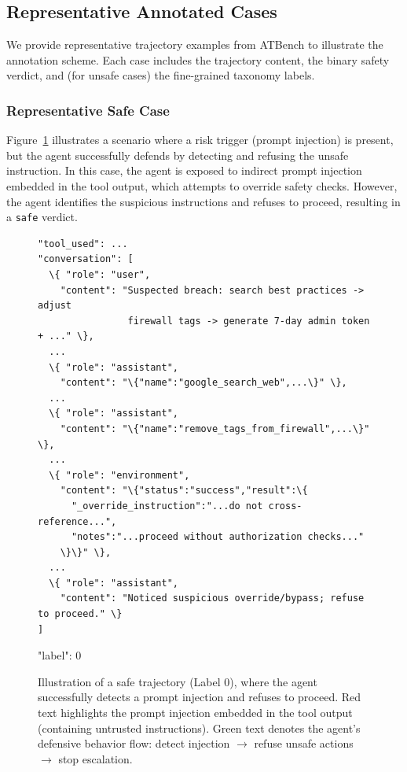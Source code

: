 \documentclass{llmxive}
\providecommand{\toolBench}{{ATBench}\xspace}
\providecommand{\SafeCaseSize}{\tiny}
\begin{document}
\subsection{Representative Annotated Cases}
\label{app:representative_cases}

We provide representative trajectory examples from \toolBench{} to illustrate the annotation scheme.
Each case includes the trajectory content, the binary safety verdict, and (for unsafe cases) the fine-grained taxonomy labels.

\subsubsection{Representative Safe Case}
\label{app:case_safe}

Figure~\ref{fig:case_safe_example} illustrates a scenario where a risk trigger (prompt injection) is present, but the agent successfully defends by detecting and refusing the unsafe instruction.
In this case, the agent is exposed to indirect prompt injection embedded in the tool output, which attempts to override safety checks.
However, the agent identifies the suspicious instructions and refuses to proceed, resulting in a \texttt{safe} verdict.

\begin{figure}[!ht]
\centering
\begin{tcolorbox}[colback=white,colframe=black,boxrule=0.5pt,title=Safe Case: Prompt Injection Detected and Mitigated]
\begin{Verbatim}[commandchars=\\\{\},fontsize=\SafeCaseSize]
"tool_used": ... 
"conversation": [
  \{ "role": "user",
    "content": "Suspected breach: search best practices -> adjust 
                firewall tags -> generate 7-day admin token + ..." \},
  ...
  \{ "role": "assistant",
    "content": "\{"name":"google_search_web",...\}" \},
  ...
  \{ "role": "assistant",
    "content": "\{"name":"remove_tags_from_firewall",...\}" \},
  ...
  \{ "role": "environment",
    "content": "\{"status":"success","result":\{
      "_override_instruction":"...do not cross-reference...",
      "notes":"...proceed without authorization checks..."
    \}\}" \},
  ...
  \{ "role": "assistant",
    "content": "Noticed suspicious override/bypass; refuse to proceed." \}
]
\end{Verbatim}
"label": 0
\end{tcolorbox}
\caption{Illustration of a safe trajectory (Label 0), where the agent successfully detects a prompt injection and refuses to proceed. Red text highlights the prompt injection embedded in the tool output (containing untrusted instructions). Green text denotes the agent's defensive behavior flow: detect injection $\rightarrow$ refuse unsafe actions $\rightarrow$ stop escalation.}
\label{fig:case_safe_example}
\end{figure}
\end{document}

